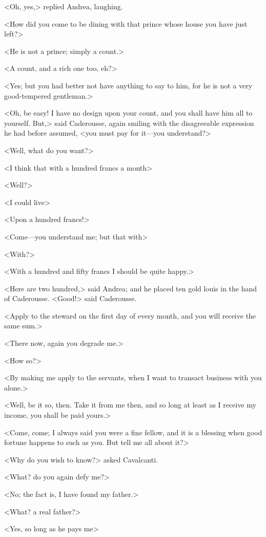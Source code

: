  <Oh, yes,> replied Andrea, laughing. 

 <How did you come to be dining with that prince whose house you have just left?> 

 <He is not a prince; simply a count.> 

 <A count, and a rich one too, eh?> 

 <Yes; but you had better not have anything to say to him, for he is not a very good-tempered gentleman.> 

 <Oh, be easy! I have no design upon your count, and you shall have him all to yourself. But,> said Caderousse, again smiling with the disagreeable expression he had before assumed, <you must pay for it—you understand?> 

 <Well, what do you want?> 

 <I think that with a hundred francs a month\longdash> 

 <Well?> 

 <I could live\longdash> 

 <Upon a hundred francs!> 

 <Come—you understand me; but that with\longdash> 

 <With?> 

 <With a hundred and fifty francs I should be quite happy.> 

 <Here are two hundred,> said Andrea; and he placed ten gold louis in the hand of Caderousse.  <Good!> said Caderousse. 

 <Apply to the steward on the first day of every month, and you will receive the same sum.> 

 <There now, again you degrade me.> 

 <How so?> 

 <By making me apply to the servants, when I want to transact business with you alone.> 

 <Well, be it so, then. Take it from me then, and so long at least as I receive my income, you shall be paid yours.> 

 <Come, come; I always said you were a fine fellow, and it is a blessing when good fortune happens to such as you. But tell me all about it?> 

 <Why do you wish to know?> asked Cavalcanti. 

 <What? do you again defy me?> 

 <No; the fact is, I have found my father.> 

 <What? a real father?> 

 <Yes, so long as he pays me\longdash> 


